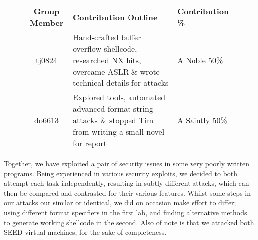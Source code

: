 \begin{figure}[h]
\centering
\begin{tabular}{|c|p{9.5cm}|l|}
\hline
{\bf Group Member} & {\bf Contribution Outline} & {\bf Contribution \%} \\
\hhline{|=|=|=|}
tj0824 & Hand-crafted buffer overflow shellcode, researched NX bits, overcame ASLR \& wrote technical details for attacks & A Noble 50\% \\
\hline
do6613 & Explored tools, automated advanced format string attacks \& stopped Tim from writing a small novel for report & A Saintly 50\% \\
\hline
\end{tabular}
\end{figure}

Together, we have exploited a pair of security issues in some very poorly written programs. Being experienced in various
security exploits, we decided to both attempt each task independently, resulting in subtly different attacks, which can
then be compared and contrasted for their various features. Whilst some steps in our attacks our similar or identical,
we did on occasion make effort to differ; using different format specifiers in the first lab, and finding alternative
methods to generate working shellcode in the second. Also of note is that we attacked both SEED virtual machines, for
the sake of completeness.

